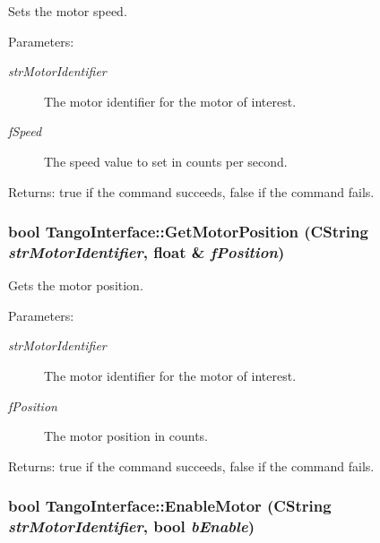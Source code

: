 Sets the motor speed. 

\begin{Desc}
\item[Parameters:]
\begin{description}
\item[{\em strMotorIdentifier}]The motor identifier for the motor of interest.\item[{\em fSpeed}]The speed value to set in counts per second. \end{description}
\end{Desc}


\begin{Desc}
\item[Returns:]true if the command succeeds, false if the command fails. \end{Desc}
\hypertarget{classTangoInterface_c14b1a6b2d195d30a26b02fdffd81428}{
\subsubsection[GetMotorPosition]{\setlength{\rightskip}{0pt plus 5cm}bool TangoInterface::GetMotorPosition (CString {\em strMotorIdentifier}, \/  float \& {\em fPosition})}}
\label{classTangoInterface_c14b1a6b2d195d30a26b02fdffd81428}


Gets the motor position. 

\begin{Desc}
\item[Parameters:]
\begin{description}
\item[{\em strMotorIdentifier}]The motor identifier for the motor of interest.\item[{\em fPosition}]The motor position in counts. \end{description}
\end{Desc}


\begin{Desc}
\item[Returns:]true if the command succeeds, false if the command fails. \end{Desc}
\hypertarget{classTangoInterface_e7b82506f5a1c901fd7f5e0843841c7d}{
\subsubsection[EnableMotor]{\setlength{\rightskip}{0pt plus 5cm}bool TangoInterface::EnableMotor (CString {\em strMotorIdentifier}, \/  bool {\em bEnable})}}
\label{classTangoInterface_e7b82506f5a1c901fd7f5e0843841c7d}


